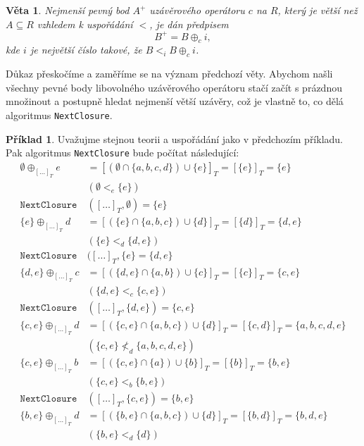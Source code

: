 \documentclass{article}
\newtheorem{theorem}{Věta}
\theoremstyle {definition}
\newtheorem{example}{Příklad}
\begin{document}
\begin {theorem}
  Nejmenší pevný bod $A^+$ uzávěrového operátoru $c$ na $R$, který je
  větší než $A\subseteq R$ vzhledem k uspořádání $<$, je dán předpisem
  $$ B^+ = B\oplus_c i,$$
  kde $i$ je největší číslo takové, že $B<_i B\oplus_c i$.
\end {theorem}

Důkaz přeskočíme a zaměříme se na význam předchozí věty. Abychom našli
všechny pevné body libovolného uzávěrového operátoru stačí začít s
prázdnou množinout a postupně hledat nejmenší větší uzávěry, což je
vlastně to, co dělá algoritmus \texttt{NextClosure}.

\begin{example}
  Uvažujme stejnou teorii a uspořádání jako v předchozím příkladu. Pak
  algoritmus \texttt{NextClosure} bude počítat následující:
  \begin{align*}
    \emptyset \oplus_{[\dots]_{T}} e
    &= [(\emptyset\cap\{a,b,c,d\})\cup\{e\}]_{T} =
      [\{e\}]_{T} = \{e\}\\
    &(\emptyset<_e \{e\})\\
    \texttt{NextClosure}&([\dots]_{T},\emptyset)=\{e\}\\    
    \{e\} \oplus_{[\dots]_{T}} d
    &= [(\{e\}\cap \{a,b,c\})\cup\{d\}]_{T} =
      [\{d\}]_{T} = \{d,e\}\\
    &(\{e\}<_d \{d,e\})\\
    \texttt{NextClosure}&([\dots]_{T},\{e\}=\{d,e\}\\    
    \{d,e\} \oplus_{[\dots]_{T}} c
    &= [(\{d,e\}\cap \{a,b\})\cup\{c\}]_{T} =
      [\{c\}]_{T} = \{c,e\}\\
    &(\{d,e\}<_c \{c,e\})\\
    \texttt{NextClosure}&([\dots]_{T},\{d,e\})=\{c,e\}\\
    \{c,e\} \oplus_{[\dots]_{T}} d
    &= [(\{c,e\}\cap \{a,b,c\})\cup\{d\}]_{T} =
      [\{c,d\}]_{T} = \{a,b,c,d,e\}\\
    &(\{c,e\}\not<_d \{a,b,c,d,e\})\\
    \{c,e\} \oplus_{[\dots]_{T}} b
    &= [(\{c,e\}\cap \{a\})\cup\{b\}]_{T} =
      [\{b\}]_{T} = \{b,e\}\\
    &(\{c,e\}<_b \{b,e\})\\
    \texttt{NextClosure}&([\dots]_{T},\{c,e\})=\{b,e\}\\
    \{b,e\} \oplus_{[\dots]_{T}} d
    &= [(\{b,e\}\cap \{a,b,c\})\cup\{d\}]_{T} =
      [\{b,d\}]_{T} = \{b,d,e\}\\
    &(\{b,e\}<_d \{d\})\\

\end{align*}
\end{example}
\end{document}
